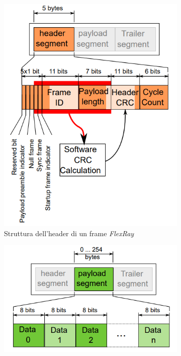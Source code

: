 \begin{figure}[h]
    \begin{subfigure}{0.4\textwidth}
        \includegraphics[width=1\textwidth]{capitoli/figure-protocolli/flexray-header.png}
        \caption{Struttura dell'header di un frame \emph{FlexRay}}
        \label{fig:flexray-header}
    \end{subfigure}
    \hfill
    \begin{subfigure}{0.4\textwidth}
        \includegraphics[width=1\textwidth]{capitoli/figure-protocolli/flexray-payload.png}

\end{subfigure}
\end{figure}
